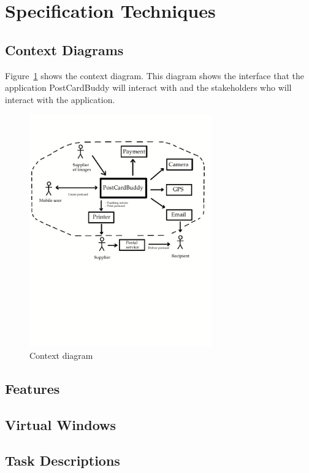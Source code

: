 \documentclass[10pt,a4paper]{article}
\begin{document}
\section{Specification Techniques}
\subsection{Context Diagrams}
Figure~\ref{fig:context} shows the context diagram. This diagram shows the interface that the application PostCardBuddy will interact with and the stakeholders who will interact with the application.

\begin{figure}[h!]
\centering
\includegraphics[width=0.7\textwidth]{ContextDiagram2.pdf}
\caption{Context diagram}
\label{fig:context}
\end{figure}

\subsection{Features}
\subsection{Virtual Windows}
\subsection{Task Descriptions}


\end{document}
